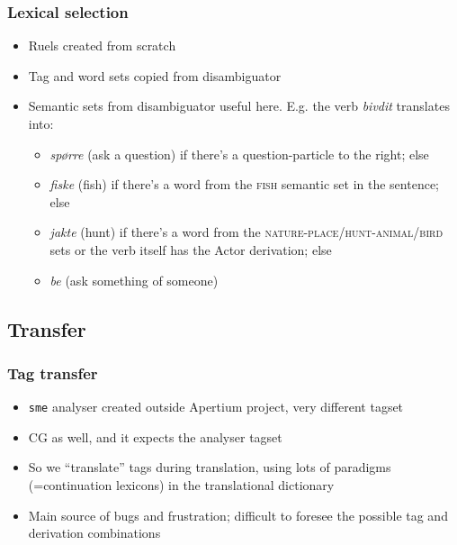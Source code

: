 \documentclass[notes=hide]{beamer}
\newcommand{\sme}{{\tt sme}}
\begin{document}
\begin{frame}\frametitle{Lexical selection}
  \begin{itemize}
  \item Ruels created from scratch
  \item Tag and word sets copied from disambiguator
  \item Semantic sets from disambiguator useful here. E.g. the verb
    \textit{bivdit} translates into:
    \begin{itemize}
    \item \textit{spørre} (ask a question) if there's a
      question-particle to the right; else
    \item \textit{fiske} (fish) if there's a word from the \textsc{fish}
      semantic set in the sentence; else
    \item \textit{jakte} (hunt) if there's a word from the
      \textsc{nature-place}/\textsc{hunt-animal}/\textsc{bird} sets or
      the verb itself has the Actor derivation; else
    \item \textit{be} (ask something of someone)
    \end{itemize}
  \end{itemize}
\end{frame}

\subsection{Transfer}
\begin{frame}\frametitle{Tag transfer}
  \begin{itemize}
  \item \sme{} analyser created outside Apertium project, very
    different tagset
  \item CG as well, and it expects the analyser tagset
  \item So we ``translate'' tags during translation, using lots of
    paradigms (=continuation lexicons) in the translational dictionary
  \item Main source of bugs and frustration; difficult to foresee the
    possible tag and derivation combinations
  \end{itemize}
\end{frame}
\end{document}
